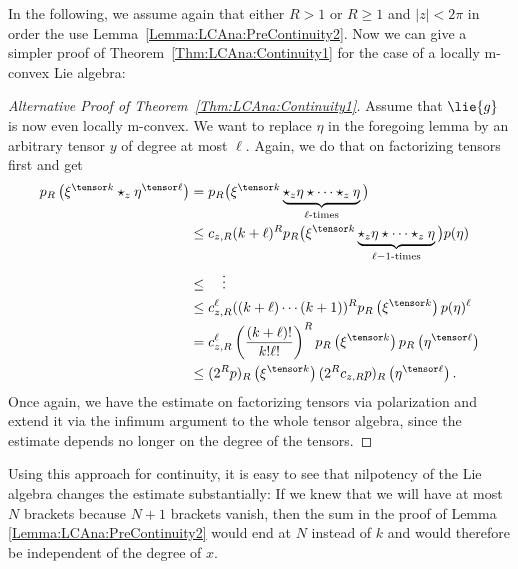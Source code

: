 In the following, we assume again that either $R > 1$ or $R \geq 1$
and $|z| < 2\pi$ in order the use
Lemma~\ref{Lemma:LCAna:PreContinuity2}. Now we can give a simpler proof of 
Theorem~\ref{Thm:LCAna:Continuity1} for the case of a locally m-convex 
Lie algebra:
\begin{proof}[Alternative Proof of Theorem~\ref{Thm:LCAna:Continuity1}]
    Assume that $\lie{g}$ is now even locally m-convex.  We want to
    replace $\eta$ in the foregoing lemma by an arbitrary tensor $y$
    of degree at most $\ell$. Again, we do that on factorizing tensors
    first and get
    \begin{align*}
        p_R \left(
        \xi^{\tensor k} \ostar_z \eta^{\tensor \ell}
        \right)
        & =
        p_R \big(
        \xi^{\tensor k}
        \underbrace{\ostar_z \eta \ostar \cdots \ostar_z \eta}_{
        \ell \textrm{-times}}
        \big)
        \\
        & \leq
        c_{z,R} (k + \ell)^R
        p_R \big(
        \xi^{\tensor k}
        \underbrace{\ostar_z \eta \ostar \cdots \ostar_z \eta}_{
        \ell - 1 \textrm{-times}}
        \big)
        p(\eta)
        \\
        & \leq
        \quad \vdots
        \\
        & \leq
        c_{z,R}^{\ell} ((k + \ell) \cdots (k + 1))^R
        p_R \left( \xi^{\tensor k} \right)
        p(\eta)^{\ell}
        \\
        & =
        c_{z,R}^{\ell} \left(
        \frac{(k + \ell)!}{k! \ell!}
        \right)^R
        p_R \left( \xi^{\tensor k} \right)
        p_R \left( \eta^{\tensor \ell} \right)
        \\
        & \leq
        (2^R p)_R \left( \xi^{\tensor k} \right)
        (2^R c_{z,R} p)_R \left( \eta^{\tensor \ell} \right).
    \end{align*}
    Once again, we have the estimate on factorizing tensors via
    polarization and extend it via the infimum argument to the whole
    tensor algebra, since the estimate depends no longer on the degree
    of the tensors.
\end{proof}


Using this approach for continuity, it is easy to see that nilpotency
of the Lie algebra changes the estimate substantially: If we knew that
we will have at most $N$ brackets because $N + 1$ brackets vanish,
then the sum in the proof of Lemma \ref{Lemma:LCAna:PreContinuity2}
would end at $N$ instead of $k$ and would therefore be independent of
the degree of $x$.



